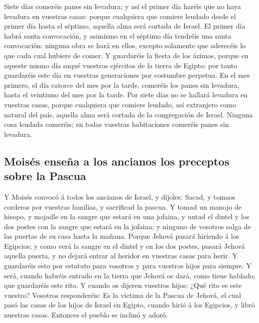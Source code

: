  Siete días comeréis panes sin levadura; y así el primer
día haréis que no haya levadura en vuestras casas: porque cualquiera que
comiere leudado desde el primer día hasta el séptimo, aquella alma será
cortada de Israel.  El primer día habrá santa
convocación, y asimismo en el séptimo día tendréis una santa
convocación: ninguna obra se hará en ellos, excepto solamente que
aderecéis lo que cada cual hubiere de comer.  Y
guardaréis la fiesta de los ázimos, porque en aqueste mismo día saqué
vuestros ejércitos de la tierra de Egipto: por tanto guardaréis este día
en vuestras generaciones por costumbre perpetua.  En el
mes primero, el día catorce del mes por la tarde, comeréis los panes sin
levadura, hasta el veintiuno del mes por la tarde.  Por
siete días no se hallará levadura en vuestras casas, porque cualquiera
que comiere leudado, así extranjero como natural del país, aquella alma
será cortada de la congregación de Israel.  Ninguna cosa
leudada comeréis; en todas vuestras habitaciones comeréis panes sin
levadura.

\hypertarget{moisuxe9s-enseuxf1a-a-los-ancianos-los-preceptos-sobre-la-pascua}{%
\subsection{Moisés enseña a los ancianos los preceptos sobre la
Pascua}\label{moisuxe9s-enseuxf1a-a-los-ancianos-los-preceptos-sobre-la-pascua}}

 Y Moisés convocó á todos los ancianos de Israel, y
díjoles: Sacad, y tomaos corderos por vuestras familias, y sacrificad la
pascua.  Y tomad un manojo de hisopo, y mojadle en la
sangre que estará en una jofaina, y untad el dintel y los dos postes con
la sangre que estará en la jofaina; y ninguno de vosotros salga de las
puertas de su casa hasta la mañana.  Porque Jehová pasará
hiriendo á los Egipcios; y como verá la sangre en el dintel y en los dos
postes, pasará Jehová aquella puerta, y no dejará entrar al heridor en
vuestras casas para herir.  Y guardaréis esto por
estatuto para vosotros y para vuestros hijos para siempre.
 Y será, cuando habréis entrado en la tierra que Jehová
os dará, como tiene hablado, que guardaréis este rito.  Y
cuando os dijeren vuestros hijos: ¿Qué rito es este vuestro?
 Vosotros responderéis: Es la víctima de la Pascua de
Jehová, el cual pasó las casas de los hijos de Israel en Egipto, cuando
hirió á los Egipcios, y libró nuestras casas. Entonces el pueblo se
inclinó y adoró.

